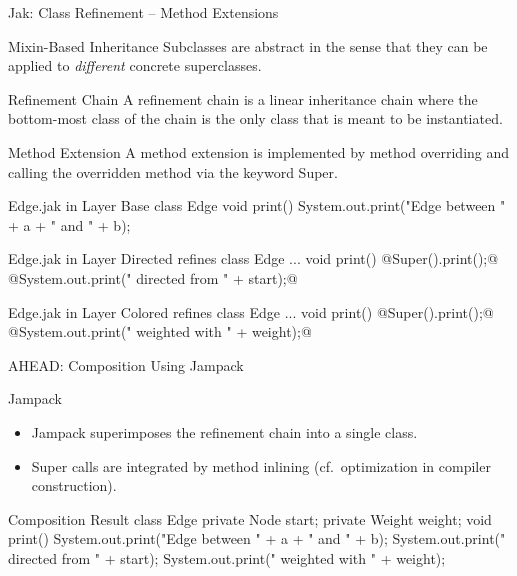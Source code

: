 \begin{frame}[fragile]{Jak: Class Refinement -- Method Extensions}
	\begin{mycolumns}[animation=none]
		\begin{definition}{Mixin-Based Inheritance}
			Subclasses are abstract in the sense that they can be applied to \emph{different} concrete superclasses.
		\end{definition}
		\begin{definition}{Refinement Chain}
			A refinement chain is a linear inheritance chain where the bottom-most class of the chain is the only class that is meant to be instantiated.
		\end{definition}
		\begin{definition}{Method Extension}
			A method extension is implemented by method overriding and calling the overridden method via the keyword Super.
		\end{definition}
	\mynextcolumn
	\footnotesize
\begin{codetight}[basicstyle=\tiny]{Edge.jak in Layer Base}
class Edge {
	void print() {
		System.out.print("Edge between " + a + " and " + b);
	}
}
\end{codetight}
\begin{codetight}[basicstyle=\tiny]{Edge.jak in Layer Directed}
refines class Edge {
	...
	void print() {
		@Super().print();@
		@System.out.print(" directed from " + start);@
	}
}
\end{codetight}
\begin{codetight}[basicstyle=\tiny]{Edge.jak in Layer Colored}
refines class Edge {
	...
	void print() {
		@Super().print();@
		@System.out.print(" weighted with " + weight);@
	}
}
\end{codetight}
	\end{mycolumns}
\end{frame}

\begin{frame}[fragile]{AHEAD: Composition Using Jampack}
	\begin{mycolumns}[widths={35,65},animation=none]
		\begin{definition}{Jampack}
			\begin{itemize}
				\item Jampack superimposes the refinement chain into a single class.
				\item Super calls are integrated by method inlining (cf.\ optimization in compiler construction).
			\end{itemize}
		\end{definition}
	\mynextcolumn
\begin{codetight}{Composition Result}
class Edge {
	private Node start;
	private Weight weight;
	void print() {
		System.out.print("Edge between " + a + " and " + b);
		System.out.print(" directed from " + start);
		System.out.print(" weighted with " + weight);
	}
}
\end{codetight}
	\end{mycolumns}
\end{frame}


